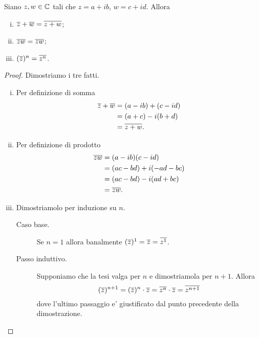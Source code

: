 \begin{proposition}\label{somma_prodotto_tra_coniugati}
    Siano $z, w \in \mathbb{C}$ tali che $z = a+ib$, $w = c + id$. Allora \begin{enumerate}[(i)]
        \item $\overline{z} + \overline{w} = \overline{z + w}$;
        \item $\overline{z}\overline{w} = \overline{zw}$;
        \item $(\overline{z})^n = \overline{z^n}$.
    \end{enumerate}
\end{proposition}
\begin{proof}
    Dimostriamo i tre fatti.
    \begin{enumerate}[(i)]
        \item Per definizione di somma \begin{alignat*}
            {1}
            \overline{z} + \overline{w} &= (a-ib) + (c - id)\\
            &= (a+c) - i(b+d)\\
            &= \overline{z + w}.
        \end{alignat*}
        \item Per definizione di prodotto \begin{alignat*}
            {1}
            \overline{z}\overline{w} &= (a-ib)(c - id)\\
            &= (ac - bd) + i(-ad-bc)\\
            &= (ac - bd) - i(ad+bc)\\
            &= \overline{zw}.
        \end{alignat*}
        \item Dimostriamolo per induzione su $n$.
        \begin{description}
            \item[Caso base.] Se $n = 1$ allora banalmente $(\overline{z})^1 = \overline{z} = \overline{z^1}$.
            \item[Passo induttivo.] Supponiamo che la tesi valga per $n$ e dimostriamola per $n+1$. Allora \[
                (\overline{z})^{n+1} = (\overline{z})^{n} \cdot \overline{z} = \overline{z^n} \cdot \overline{z} = \overline{z^{n+1}}
            \] dove l'ultimo passaggio e' giustificato dal punto precedente della dimostrazione. \qedhere
        \end{description}
    \end{enumerate}
\end{proof}

